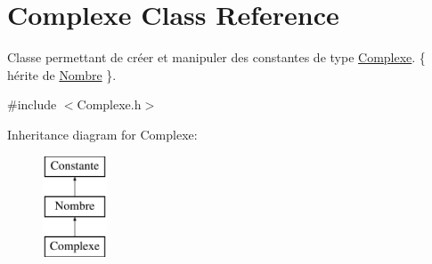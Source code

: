 \hypertarget{classComplexe}{\section{\-Complexe \-Class \-Reference}
\label{classComplexe}
}


\-Classe permettant de créer et manipuler des constantes de type \hyperlink{classComplexe}{\-Complexe}. \{ hérite de \hyperlink{classNombre}{\-Nombre} \}.  




{\ttfamily \#include $<$\-Complexe.\-h$>$}

\-Inheritance diagram for \-Complexe\-:\begin{figure}[H]
\begin{center}
\leavevmode
\includegraphics[height=3.000000cm]{classComplexe}
\end{center}
\end{figure}

